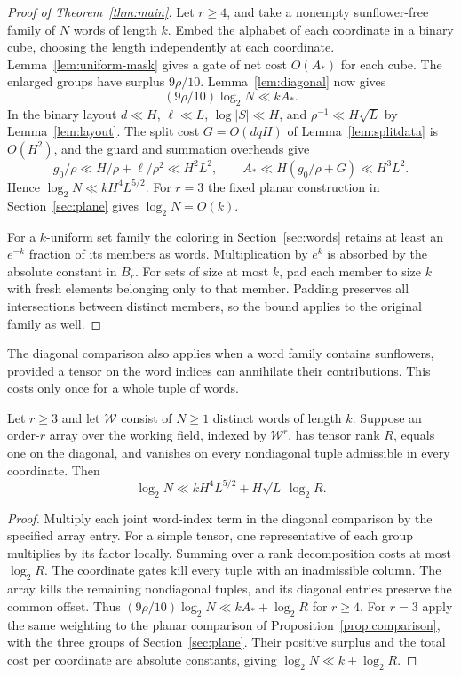 \begin{proof}[Proof of Theorem~\ref{thm:main}]
Let \(r\ge4\), and take a nonempty sunflower-free family of \(N\)
words of length \(k\). Embed the alphabet of each coordinate in a
binary cube, choosing the length independently at each coordinate.
Lemma~\ref{lem:uniform-mask} gives a gate of net cost \(O(A_*)\)
for each cube. The enlarged groups have surplus \(9\rho/10\).
Lemma~\ref{lem:diagonal} now gives
\[
                         (9\rho/10)\log_2 N\ll k A_* .
\]
In the binary layout \(d\ll H\), \(\ell\ll L\), \(\log |S|\ll H\),
and \(\rho^{-1}\ll H\sqrt L\) by Lemma~\ref{lem:layout}. The split
cost \(G=O(dqH)\) of Lemma~\ref{lem:splitdata} is \(O(H^2)\), and
the guard and summation overheads give
\[
 g_0/\rho\ll H/\rho+\ell/\rho^2\ll H^2 L^2,\qquad
 A_*\ll H(g_0/\rho+G)\ll H^3L^2 .
\]
Hence \(\log_2 N\ll kH^4L^{5/2}\). For \(r=3\) the fixed planar
construction in Section~\ref{sec:plane} gives \(\log_2 N=O(k)\).

For a \(k\)-uniform set family the coloring in Section~\ref{sec:words}
retains at least an \(e^{-k}\) fraction of its members as words.
Multiplication by \(e^k\) is absorbed by the absolute constant in
\(B_r\). For sets of size at most \(k\), pad each member to size \(k\)
with fresh elements belonging only to that member. Padding preserves
all intersections between distinct members, so the bound applies to
the original family as well.
\end{proof}

The diagonal comparison also applies when a word family contains
sunflowers, provided a tensor on the word indices can annihilate their
contributions. This costs only once for a whole tuple of words.

\begin{corollary}\label{cor:weighted}
Let \(r\ge3\) and let \(\mathcal W\) consist of \(N\ge1\) distinct words
of length \(k\). Suppose an order-\(r\) array over the working field,
indexed by \(\mathcal W^r\), has tensor rank \(R\), equals one on the
diagonal, and vanishes on every nondiagonal tuple admissible in
every coordinate. Then
\[
        \log_2 N\ll kH^4L^{5/2}+H\sqrt L\,\log_2 R .
\]
\end{corollary}
\begin{proof}
Multiply each joint word-index term in the diagonal comparison by
the specified array entry. For a simple tensor, one representative
of each group multiplies by its factor locally. Summing over a rank
decomposition costs at most \(\log_2 R\). The coordinate gates kill
every tuple with an inadmissible column. The array kills the remaining
nondiagonal tuples, and its diagonal entries preserve the common
offset. Thus \((9\rho/10)\log_2 N\ll k A_*+\log_2 R\) for \(r\ge4\).
For \(r=3\) apply the same weighting to the planar comparison of
Proposition~\ref{prop:comparison}, with the three groups of
Section~\ref{sec:plane}. Their positive surplus and the total
cost per coordinate are absolute constants, giving
\(\log_2 N\ll k+\log_2 R\).
\end{proof}

